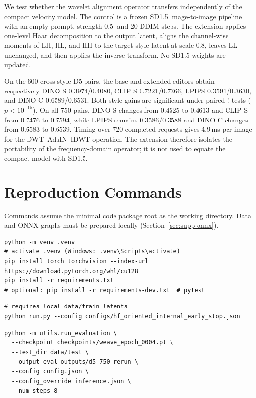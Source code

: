 \documentclass[letterpaper]{article}
\begin{document}
We test whether the wavelet alignment operator transfers independently of the compact
velocity model. The control is a frozen SD1.5 image-to-image pipeline with an empty prompt,
strength 0.5, and 20 DDIM steps. The extension applies one-level Haar decomposition to the
output latent, aligns the channel-wise moments of LH, HL, and HH to the target-style latent
at scale 0.8, leaves LL unchanged, and then applies the inverse transform. No SD1.5 weights
are updated.

On the 600 cross-style D5 pairs, the base and extended editors obtain respectively
DINO-S 0.3974/0.4080, CLIP-S 0.7221/0.7366, LPIPS 0.3591/0.3630, and DINO-C
0.6589/0.6531. Both style gains are significant under paired $t$-tests
($p<10^{-15}$). On all 750 pairs, DINO-S changes from 0.4525 to 0.4613 and CLIP-S
from 0.7476 to 0.7594, while LPIPS remains 0.3586/0.3588 and DINO-C changes from
0.6583 to 0.6539. Timing over 720 completed requests gives 4.9\,ms per image for the
DWT--AdaIN--IDWT operation. The extension therefore isolates the portability of the
frequency-domain operator; it is not used to equate the compact model with SD1.5.



\section{Reproduction Commands}

Commands assume the minimal code package root as the working directory. Data and ONNX
graphs must be prepared locally (Section~\ref{sec:supp-onnx}).

\begin{lstlisting}[style=cmd,caption={Environment setup}]
python -m venv .venv
# activate .venv (Windows: .venv\Scripts\activate)
pip install torch torchvision --index-url https://download.pytorch.org/whl/cu128
pip install -r requirements.txt
# optional: pip install -r requirements-dev.txt  # pytest
\end{lstlisting}

\begin{lstlisting}[style=cmd,caption={Train the D5-512 paper checkpoint}]
# requires local data/train latents
python run.py --config configs/hf_oriented_internal_early_stop.json
\end{lstlisting}

\begin{lstlisting}[style=cmd,caption={Evaluate the selected D5 checkpoint (Table~1 D5 row)}]
python -m utils.run_evaluation \
  --checkpoint checkpoints/weave_epoch_0004.pt \
  --test_dir data/test \
  --output eval_outputs/d5_750_rerun \
  --config config.json \
  --config_override inference.json \
  --num_steps 8
\end{lstlisting}
\end{document}
